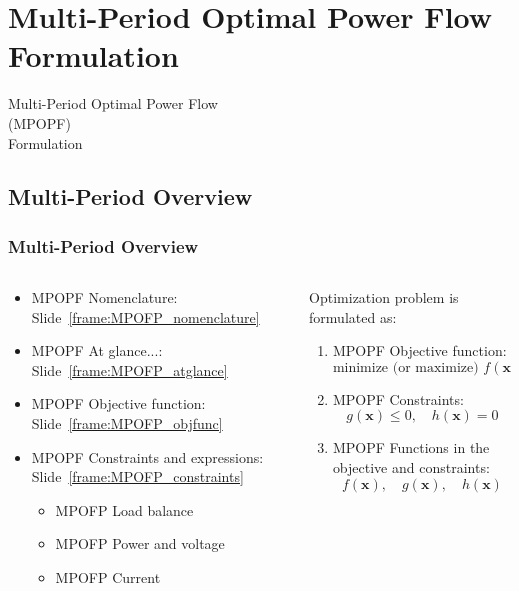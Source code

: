 \documentclass[
	11pt, %
	aspectratio=169, %
]{beamer}
\begin{document}
\section{Multi-Period Optimal Power Flow Formulation}

\begin{frame}[plain] %
	\begin{center}
		{\Huge Multi-Period Optimal Power Flow \\ (MPOPF) \\  Formulation}
		
		\bigskip\bigskip %
		
	\end{center}
\end{frame}


\subsection{Multi-Period Overview}

\begin{frame}
	\frametitle{Multi-Period Overview}
	
	\begin{columns}
		\begin{column}{0.5\textwidth}
			\begin{itemize}
				\item MPOPF Nomenclature: Slide~\ref{frame:MPOFP_nomenclature}
				\item MPOPF At glance...: Slide~\ref{frame:MPOFP_atglance}
				\item MPOPF Objective function: Slide~\ref{frame:MPOFP_objfunc}
				\item MPOPF Constraints and expressions: Slide~\ref{frame:MPOFP_constraints}
					\begin{itemize}
						\item MPOFP Load balance
						\item MPOFP Power and voltage
						\item MPOFP Current
					\end{itemize}
			\end{itemize}
		\end{column}

		\begin{column}{0.5\textwidth}
			Optimization problem is formulated as:
			\begin{enumerate}
				\item MPOPF Objective function:
				\[
					\text{minimize (or maximize) } f(\mathbf{x})
				\]
				\item MPOPF Constraints:
				\[
					g(\mathbf{x}) \leq 0, \quad h(\mathbf{x}) = 0
				\]
				\item MPOPF Functions in the objective and constraints:
				\[
					f(\mathbf{x}), \quad g(\mathbf{x}), \quad h(\mathbf{x})
				\]
			\end{enumerate}
		\end{column}
	\end{columns}
\end{frame}
\end{document}

